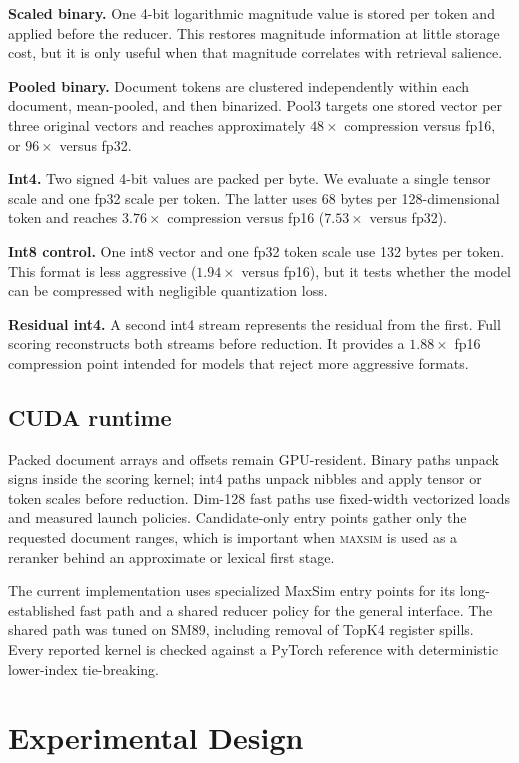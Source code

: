 \documentclass{article}
\newcommand{\sysname}{\textsc{maxsim}}
\begin{document}
\textbf{Scaled binary.} One 4-bit logarithmic magnitude value is stored per
token and applied before the reducer. This restores magnitude information at
little storage cost, but it is only useful when that magnitude correlates
with retrieval salience.

\textbf{Pooled binary.} Document tokens are clustered independently within
each document, mean-pooled, and then binarized. Pool3 targets one stored vector
per three original vectors and reaches approximately $48\times$ compression
versus fp16, or $96\times$ versus fp32.

\textbf{Int4.} Two signed 4-bit values are packed per byte. We evaluate a
single tensor scale and one fp32 scale per token. The latter uses 68 bytes per
128-dimensional token and reaches $3.76\times$ compression versus fp16
($7.53\times$ versus fp32).

\textbf{Int8 control.} One int8 vector and one fp32 token scale use 132 bytes
per token. This format is less aggressive ($1.94\times$ versus fp16), but it
tests whether the model can be compressed with negligible quantization loss.

\textbf{Residual int4.} A second int4 stream represents the residual from the
first. Full scoring reconstructs both streams before reduction. It provides a
$1.88\times$ fp16 compression point intended for models that reject more
aggressive formats.

\subsection{CUDA runtime}

Packed document arrays and offsets remain GPU-resident. Binary paths unpack
signs inside the scoring kernel; int4 paths unpack nibbles and apply tensor or
token scales before reduction. Dim-128 fast paths use fixed-width vectorized
loads and measured launch policies. Candidate-only entry points gather only
the requested document ranges, which is important when \sysname{} is used as
a reranker behind an approximate or lexical first stage.

The current implementation uses specialized MaxSim entry points for its
long-established fast path and a shared reducer policy for the general
interface. The shared path was tuned on SM89, including removal of TopK4
register spills. Every reported kernel is checked against a PyTorch reference
with deterministic lower-index tie-breaking.

\section{Experimental Design}
\end{document}
